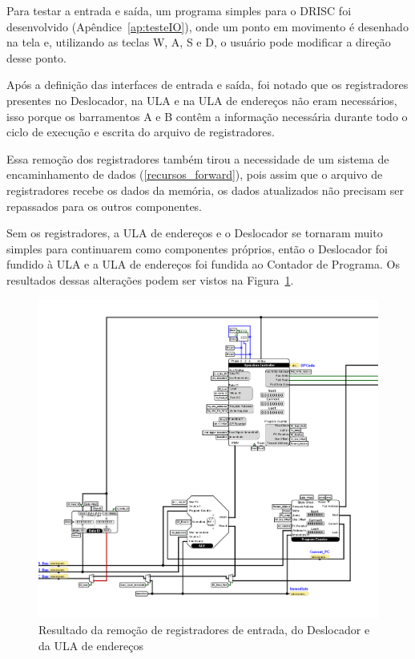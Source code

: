 \documentclass[
	12pt,				%
	openright,			%
	oneside,			%
	a4paper,			%
	english,			%
	french,				%
	spanish,			%
	brazil,				%
	]{abntex2}
\begin{document}
Para testar a entrada e saída, um programa simples para o DRISC foi desenvolvido (Apêndice~\ref{ap:testeIO}), onde um ponto em movimento é desenhado na tela e, utilizando as teclas W, A, S e D, o usuário pode modificar a direção desse ponto.

Após a definição das interfaces de entrada e saída, foi notado que os registradores presentes no Deslocador, na ULA e na ULA de endereços não eram necessários, isso porque os barramentos A e B contêm a informação necessária durante todo o ciclo de execução e escrita do arquivo de registradores.  

Essa remoção dos registradores também tirou a necessidade de um sistema de encaminhamento de dados (\ref{recursos_forward}), pois assim que o arquivo de registradores recebe os dados da memória, os dados atualizados não precisam ser repassados para os outros componentes.

Sem os registradores, a ULA de endereços e o Deslocador se tornaram muito simples para continuarem como componentes próprios, então o Deslocador foi fundido à ULA e a ULA de endereços foi fundida ao Contador de Programa. Os resultados dessas alterações podem ser vistos na Figura~\ref{fig:Shifter_removal}.
\begin{figure}
    \centering
    \includegraphics[width=1\linewidth]{ProcessoDesenvolvimento/Arquitetura/Shifter_removal.png}
    \caption{Resultado da remoção de registradores de entrada, do Deslocador e da ULA de endereços}
    \label{fig:Shifter_removal}
\end{figure}
\end{document}
